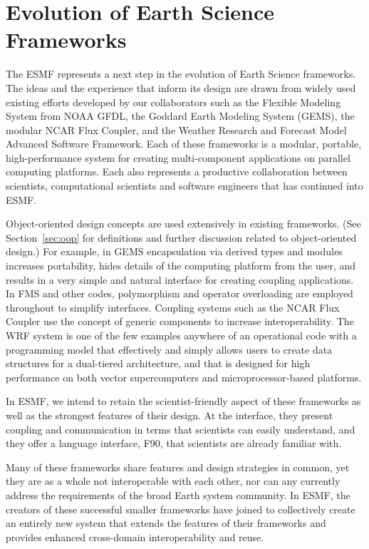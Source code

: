 \section{Evolution of Earth Science Frameworks}
\label{sec:archbackground}

The ESMF represents a next step in the evolution of Earth Science
frameworks.  The ideas and the experience that inform its design
are drawn from widely used existing efforts developed by our collaborators 
such as the Flexible Modeling System from NOAA GFDL, the Goddard 
Earth Modeling System (GEMS), the
modular NCAR Flux Coupler, and the Weather Research and Forecast Model
Advanced Software Framework.  Each of these frameworks is a modular,
portable, high-performance system for creating multi-component applications
on parallel computing platforms.  Each also represents a productive
collaboration between scientists, computational scientists and software
engineers that has continued into ESMF.  

Object-oriented design concepts are used extensively in existing frameworks. 
(See Section~\ref{sec:oop} for definitions and further discussion related to
object-oriented design.)
For example, in GEMS encapsulation 
via derived types and modules increases portability, hides details of the 
computing platform from the user, and results in a very simple and natural
interface for creating coupling applications.  
In FMS and other codes, polymorphism and operator overloading are 
employed throughout to simplify interfaces.  Coupling systems such 
as the NCAR Flux Coupler use the concept of generic components to
increase interoperability.  The WRF system is one of the few 
examples anywhere of an operational code with a programming model 
that effectively and simply allows users to create data structures 
for a dual-tiered architecture, and that is designed for high performance
on both vector supercomputers and microprocessor-based platforms.

In ESMF, we intend to retain the scientist-friendly 
aspect of these frameworks as well as the strongest features of their design.  
At the interface, they present coupling and
communication in terms that scientists can easily understand, and they 
offer a language interface, F90, that scientists are already familiar 
with.  

Many of these frameworks share features and design strategies in common, yet 
they are as a whole not
interoperable with each other, nor can any currently address the requirements
of the broad Earth system community.  In ESMF, the creators of 
these successful smaller frameworks have joined to collectively create an
entirely new system that extends the features of their frameworks and provides 
enhanced cross-domain interoperability and reuse.



